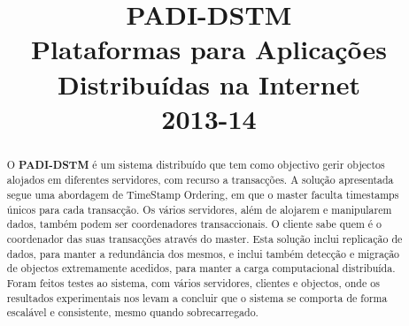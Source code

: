 \documentclass[times, 10pt,twocolumn]{article}
\begin{document}
\title{\huge{PADI-DSTM} \\[0,1in] \textmd{Plataformas para Aplicações Distribuídas na Internet \\[0,05in] 2013-14}}

\maketitle
\thispagestyle{empty}

\begin{abstract}

O \textbf{PADI-DSTM} é um sistema distribuído que tem como objectivo gerir objectos alojados em diferentes servidores, com recurso a transacções. A solução apresentada segue uma abordagem de TimeStamp Ordering\cite{ex1}, em que o master faculta timestamps únicos para cada transacção. Os vários servidores, além de alojarem e manipularem dados, também podem ser coordenadores transaccionais. O cliente sabe quem é o coordenador das suas transacções através do master. Esta solução inclui replicação de dados, para manter a redundância dos mesmos, e inclui também detecção e migração de objectos extremamente acedidos, para manter a carga computacional distribuída. Foram feitos testes ao sistema, com vários servidores, clientes e objectos, onde os resultados experimentais nos levam a concluir que o sistema se comporta de forma escalável e consistente, mesmo quando sobrecarregado. 

\end{abstract}









\nocite{ex1}


\end{document}
